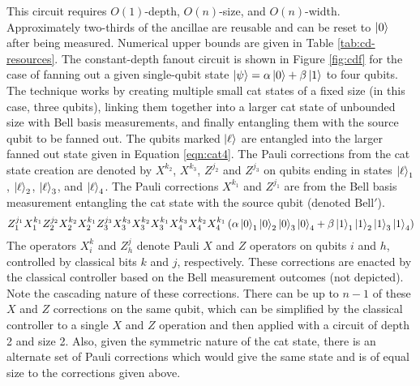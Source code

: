 This circuit requires $O(1)$-depth, $O(n)$-size, and $O(n)$-width. Approximately
two-thirds of the ancillae are reusable and can be reset to $\left\vert{0}\right\rangle$ after
being measured. Numerical upper bounds are given in Table \ref{tab:cd-resources}.
The constant-depth fanout circuit is shown in Figure \ref{fig:cdf} for the case of fanning out a given single-qubit state
$\left\vert{\psi}\right\rangle = \alpha\left\vert{0}\right\rangle + \beta\left\vert{1}\right\rangle$ to four qubits.
The technique works by creating multiple small
cat states of a fixed size (in this case, three qubits), linking them
together into a larger cat state of unbounded size with Bell basis measurements,
and finally entangling them with the source qubit to be fanned out.
The qubits marked $\left\vert{\ell}\right\rangle$ are
entangled into the larger fanned out state given in Equation \ref{eqn:cat4}.
The Pauli corrections from the cat state creation are denoted by
$X^{k_2}$, $X^{k_3}$, $Z^{j_2}$ and $Z^{j_3}$ on qubits ending in
states $\left\vert{\ell}\right\rangle_1$, $\left\vert{\ell}\right\rangle_2$,
$\left\vert{\ell}\right\rangle_3$, and $\left\vert{\ell}\right\rangle_4$. The Pauli corrections
$X^{k_1}$ and $Z^{j_1}$ are from the Bell basis measurement
entangling the cat state with the source qubit (denoted $\text{Bell}'$).
\begin{equation}
Z_1^{j_1}X_1^{k_1}Z_2^{j_2}X_2^{k_2}X_2^{k_1}Z_{3}^{j_3}X_{3}^{k_3}X_{3}^{k_2}X_{3}^{k_1}X_{4}^{k_3}X_{4}^{k_2}X_{4}^{k_1}
\left(\alpha \left\vert{0}\right\rangle_1\left\vert{0}\right\rangle_2\left\vert{0}\right\rangle_3\left\vert{0}\right\rangle_4 + \beta \left\vert{1}\right\rangle_1\left\vert{1}\right\rangle_2\left\vert{1}\right\rangle_3\left\vert{1}\right\rangle_4 \right)
\label{eqn:cat4}
\end{equation}
%
The operators $X^k_i$ and $Z^j_{h}$ denote Pauli $X$ and $Z$ operators
on qubits $i$ and $h$, controlled by classical bits $k$ and $j$,
respectively. These corrections are enacted by the classical controller based on
the Bell measurement outcomes (not depicted).
Note the cascading nature of these corrections.
There can be up to
$n-1$ of these $X$ and $Z$
corrections on the same qubit, which can be simplified by the classical
controller to a single $X$ and $Z$ operation and then applied with a circuit of
depth 2 and size 2. Also, given the symmetric nature of the cat state, there
is an alternate set of Pauli corrections which would give the same state and
is of equal size to the corrections given above.

